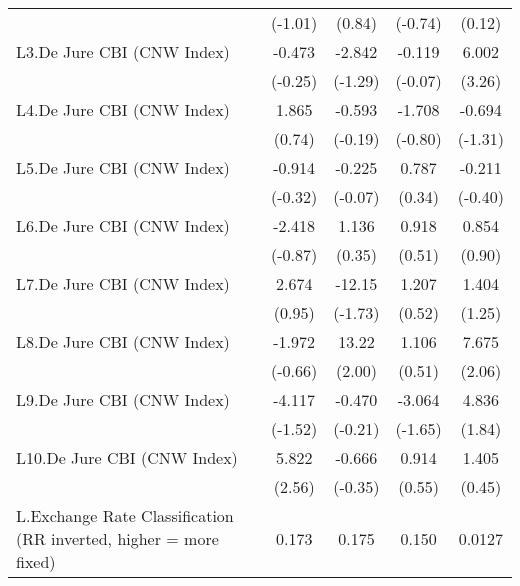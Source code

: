 {\begin{longtable}{l*{4}{c}}
                &  (-1.01)         &   (0.84)         &  (-0.74)         &   (0.12)         \\
\addlinespace
L3.De Jure CBI (CNW Index)&   -0.473         &   -2.842         &   -0.119         &    6.002\sym{**} \\
                &  (-0.25)         &  (-1.29)         &  (-0.07)         &   (3.26)         \\
\addlinespace
L4.De Jure CBI (CNW Index)&    1.865         &   -0.593         &   -1.708         &   -0.694         \\
                &   (0.74)         &  (-0.19)         &  (-0.80)         &  (-1.31)         \\
\addlinespace
L5.De Jure CBI (CNW Index)&   -0.914         &   -0.225         &    0.787         &   -0.211         \\
                &  (-0.32)         &  (-0.07)         &   (0.34)         &  (-0.40)         \\
\addlinespace
L6.De Jure CBI (CNW Index)&   -2.418         &    1.136         &    0.918         &    0.854         \\
                &  (-0.87)         &   (0.35)         &   (0.51)         &   (0.90)         \\
\addlinespace
L7.De Jure CBI (CNW Index)&    2.674         &   -12.15         &    1.207         &    1.404         \\
                &   (0.95)         &  (-1.73)         &   (0.52)         &   (1.25)         \\
\addlinespace
L8.De Jure CBI (CNW Index)&   -1.972         &    13.22\sym{*}  &    1.106         &    7.675\sym{*}  \\
                &  (-0.66)         &   (2.00)         &   (0.51)         &   (2.06)         \\
\addlinespace
L9.De Jure CBI (CNW Index)&   -4.117         &   -0.470         &   -3.064         &    4.836         \\
                &  (-1.52)         &  (-0.21)         &  (-1.65)         &   (1.84)         \\
\addlinespace
L10.De Jure CBI (CNW Index)&    5.822\sym{*}  &   -0.666         &    0.914         &    1.405         \\
                &   (2.56)         &  (-0.35)         &   (0.55)         &   (0.45)         \\
\addlinespace
L.Exchange Rate Classification (RR inverted, higher = more fixed)&    0.173         &    0.175         &    0.150         &   0.0127         \\

\end{longtable}}
